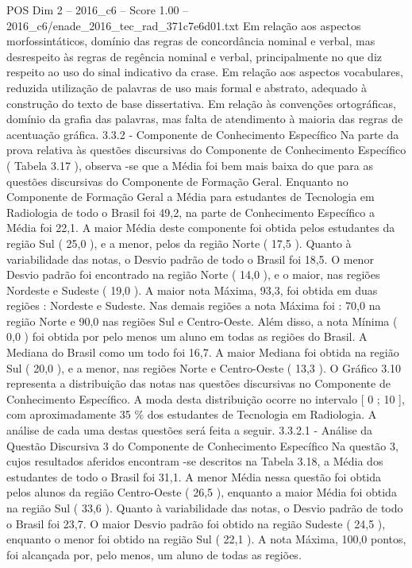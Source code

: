 \begin{textsample}{POS Dim 2 – 2016\_c6 – Score 1.00 – 2016\_c6/enade\_2016\_tec\_rad\_371c7e6d01.txt}
Em relação aos aspectos morfossintáticos, domínio das regras de concordância nominal e verbal, mas desrespeito às regras de regência nominal e verbal, principalmente no que diz respeito ao uso do sinal indicativo da crase.
Em relação aos aspectos vocabulares, reduzida utilização de palavras de uso mais formal e abstrato, adequado à construção do texto de base dissertativa.
Em relação às convenções ortográficas, domínio da grafia das palavras, mas falta de atendimento à maioria das regras de acentuação gráfica. 3.3.2 - Componente de Conhecimento Específico Na parte da prova relativa às questões discursivas do Componente de Conhecimento Específico ( Tabela 3.17 ), observa -se que a Média foi bem mais baixa do que para as questões discursivas do Componente de Formação Geral.
Enquanto no Componente de Formação Geral a Média para estudantes de Tecnologia em Radiologia de todo o Brasil foi 49,2, na parte de Conhecimento Específico a Média foi 22,1.
A maior Média deste componente foi obtida pelos estudantes da região Sul ( 25,0 ), e a menor, pelos da região Norte ( 17,5 ).
Quanto à variabilidade das notas, o Desvio padrão de todo o Brasil foi 18,5.
O menor Desvio padrão foi encontrado na região Norte ( 14,0 ), e o maior, nas regiões Nordeste e Sudeste ( 19,0 ).
A maior nota Máxima, 93,3, foi obtida em duas regiões : Nordeste e Sudeste.
Nas demais regiões a nota Máxima foi : 70,0 na região Norte e 90,0 nas regiões Sul e Centro-Oeste.
Além disso, a nota Mínima ( 0,0 ) foi obtida por pelo menos um aluno em todas as regiões do Brasil.
A Mediana do Brasil como um todo foi 16,7.
A maior Mediana foi obtida na região Sul ( 20,0 ), e a menor, nas regiões Norte e Centro-Oeste ( 13,3 ).
O Gráfico 3.10 representa a distribuição das notas nas questões discursivas no Componente de Conhecimento Específico.
A moda desta distribuição ocorre no intervalo [ 0 ; 10 ], com aproximadamente 35 \% dos estudantes de Tecnologia em Radiologia.
A análise de cada uma destas questões será feita a seguir. 3.3.2.1 - Análise da Questão Discursiva 3 do Componente de Conhecimento Específico Na questão 3, cujos resultados aferidos encontram -se descritos na Tabela 3.18, a Média dos estudantes de todo o Brasil foi 31,1.
A menor Média nessa questão foi obtida pelos alunos da região Centro-Oeste ( 26,5 ), enquanto a maior Média foi obtida na região Sul ( 33,6 ).
Quanto à variabilidade das notas, o Desvio padrão de todo o Brasil foi 23,7.
O maior Desvio padrão foi obtido na região Sudeste ( 24,5 ), enquanto o menor foi obtido na região Sul ( 22,1 ).
A nota Máxima, 100,0 pontos, foi alcançada por, pelo menos, um aluno de todas as regiões.

\end{textsample}
